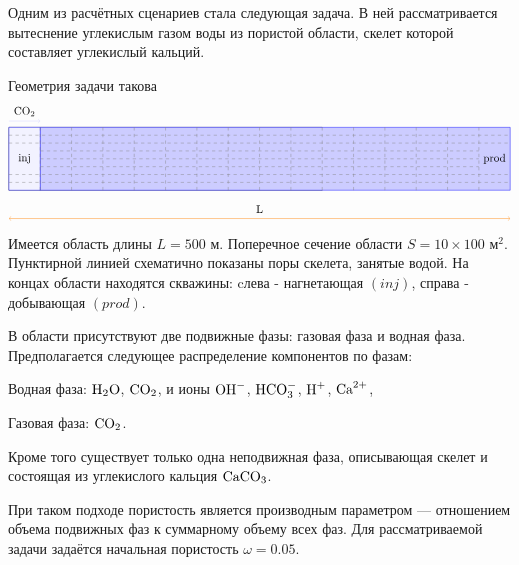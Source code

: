 \documentclass[14pt,a4paper]{extarticle}
\begin{document}
Одним из расчётных сценариев стала следующая задача. В ней рассматривается вытеснение углекислым газом воды из пористой области, скелет которой составляет углекислый кальций. 

Геометрия задачи такова
$$
\tikz {


\draw (0,0) --  +(10,0) -- +(10,2) -- +(0, 2) -- +(0,0);
\filldraw[fill=blue!20!white, draw=blue] (1,0) --  (16,0) -- (16,2) -- (1, 2) -- (1,0);
\filldraw[fill=blue!5!white, draw=blue] (0,0) --  (1,0) -- (1,2) -- (0, 2) -- (0,0);
\draw[dashed, gray] (0,0.25) -- (16,0.25); 
\draw[dashed, gray] (0,0.5) -- (16,0.5); 
\draw[dashed, gray] (1,0.75) -- (15,0.75); 
\draw[dashed, gray] (1, 1) -- (15, 1);
\draw[dashed, gray] (1,1.25) -- (15,1.25); 
\draw[dashed, gray] (0,1.5) -- (16,1.5); 
\draw[dashed, gray] (0,1.75) -- (16,1.75);

\draw[dashed, gray] (1,0) -- (1,2); 
\draw[dashed, gray] (2,0) -- (2,2); 
\draw[dashed, gray] (3,0) -- (3,2); 
\draw[dashed, gray] (4,0) -- (4,2); 
\draw[dashed, gray] (5,0) -- (5,2); 
\draw[dashed, gray] (6,0) -- (6,2); 
\draw[dashed, gray] (7,0) -- (7,2); 
\draw[dashed, gray] (8,0) -- (8,2);
\draw[dashed, gray] (9,0) -- (9,2);
\draw[dashed, gray] (10,0) -- (10,2); 
\draw[dashed, gray] (11,0) -- (11,2); 
\draw[dashed, gray] (12,0) -- (12,2); 
\draw[dashed, gray] (13,0) -- (13,2); 
\draw[dashed, gray] (14,0) -- (14,2); 
\draw[dashed, gray] (15,0) -- (15,2);

\draw [<->, orange] (0, -0.9) -- (16, -0.9); 
\draw [->, blue!20!white] (0, 2.2) -- (1, 2.2);
\fill
(0.5,1) node {inj}
(15.5,1) node {prod} 
(8,-0.6) node {L}
(0.5, 2.5) node {$\CARB$}
}
$$
Имеется область длины $L = 500 \text{ м}$. Поперечное сечение области $S = 10\times100 \text{ м}^2$. Пунктирной линией схематично показаны поры скелета, занятые водой. На концах области находятся скважины: cлева - нагнетающая $(inj)$, справа - добывающая $(prod)$. 

В области присутствуют две подвижные фазы: газовая фаза и водная фаза.
Предполагается следующее распределение компонентов по фазам:

Водная фаза: $ \text{H}_2\text{O}$, $ \text{CO}_2$, и ионы $ \text{OH}^-$, $ \text{HCO}_3^{-}$, $ \text{H}^+$, $ \text{Ca}^{2+}$,

Газовая фаза: $\text{CO}_2 $.

Кроме того существует только одна неподвижная фаза, описывающая скелет и состоящая из углекислого кальция $\text{CaCO}_3$.

При таком подходе пористость является производным параметром — отношением объема подвижных фаз к суммарному объему всех фаз.
Для рассматриваемой задачи задаётся начальная пористость $\omega = 0.05$.
\end{document}
